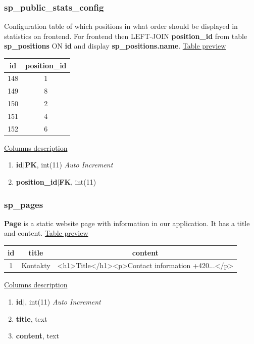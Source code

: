 \subsubsection*{sp\_public\_stats\_config}
Configuration table of which positions in what order should be displayed in statistics on frontend. For frontend then LEFT-JOIN \textbf{position\_id} from table \textbf{sp\_positions} ON \textbf{id} and display \textbf{sp\_positions.name}.
\newline
\underline{Table preview}
\begin{center}
 \begin{tabular}{||c c||} 
 \hline
 id & position\_id  \\ [0.5ex] 
 \hline\hline
 148 & 1 \\ 
 \hline
 149 & 8  \\ 
 \hline
 150 & 2  \\ 
 \hline
 151 & 4  \\ 
 \hline
 152 & 6  \\  
 \hline
 \end{tabular}
\end{center}
\underline{Columns description}
\begin{enumerate}
  \setlength\itemsep{0em}
  \item \textbf{id$|$PK}, int(11) \textit{Auto Increment}
  \item \textbf{position\_id$|$FK}, int(11)
\end{enumerate}

\subsubsection*{sp\_pages}
\textbf{Page} is a static website page with information in our application. It has a title and content.
\newline
\underline{Table preview}
\begin{center}
 \begin{tabular}{||c c c||} 
 \hline
 id & title & content \\ [0.5ex] 
 \hline\hline
 1 & Kontakty &  \textless h1\textgreater Title\textless /h1\textgreater  \textless p\textgreater Contact information +420...\textless /p\textgreater  \\

 \hline
\end{tabular}
\end{center}
\underline{Columns description}
\begin{enumerate}
  \setlength\itemsep{0em}
  \item \textbf{id$|$}, int(11) \textit{Auto Increment}
  \item \textbf{title}, text
  \item \textbf{content}, text
\end{enumerate}
\newpage
